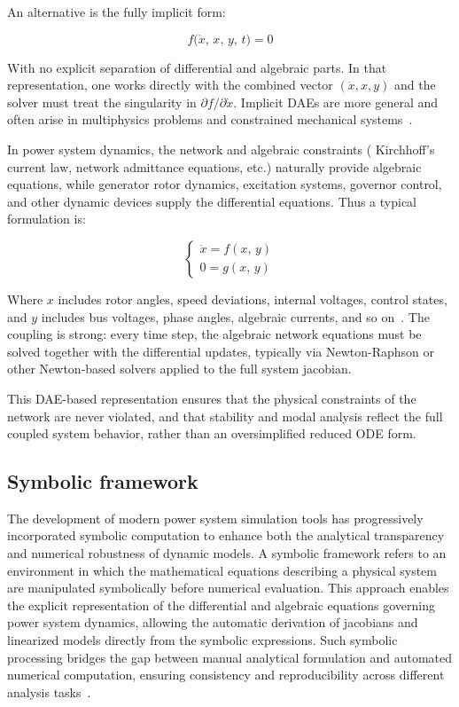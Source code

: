 An alternative is the fully implicit form:  

\begin{equation}
f\bigl(\dot{x},\, x,\, y,\, t \bigr) = 0
\end{equation}

With no explicit separation of differential and algebraic parts. In that representation, one works directly with the combined vector $(\dot{x}, x, y)$ and the solver must treat 
the singularity in $\partial f / \partial \dot{x}$. Implicit DAEs are more general and often arise in multiphysics problems and constrained mechanical systems~\cite{CasellaDAE}.  

 
In power system dynamics, the network and algebraic constraints ( Kirchhoff's current law, network admittance equations, etc.) naturally provide algebraic equations, 
while generator rotor dynamics, excitation systems, governor control, and other dynamic devices supply the differential equations. Thus a typical formulation is:

\begin{equation}
\begin{cases}
\dot{x} = f(x,\, y) \\
0 = g(x,\, y)
\end{cases}
\end{equation}

Where $x$ includes rotor angles, speed deviations, internal voltages, control states, and $y$ includes bus voltages, phase angles, algebraic currents, and so on~\cite{SauerPaiBook}. 
The coupling is strong: every time step, the algebraic network equations must be solved together with the differential updates, typically via Newton-Raphson or other Newton-based 
solvers applied to the full system jacobian.   

This DAE-based representation ensures that the physical constraints of the network are never violated, and that stability and modal analysis reflect the full coupled system behavior,
rather than an oversimplified reduced ODE form.  

\subsection{Symbolic framework}

The development of modern power system simulation tools has progressively incorporated symbolic computation to enhance both the analytical transparency and numerical
robustness of dynamic models. A symbolic framework refers to an environment in which the mathematical equations describing a physical system are manipulated symbolically
before numerical evaluation. This approach enables the explicit representation of the differential and algebraic equations governing power system dynamics, allowing the 
automatic derivation of jacobians and linearized models directly from the symbolic expressions.
Such symbolic processing bridges the gap between manual analytical formulation and automated numerical computation, ensuring consistency and reproducibility across 
different analysis tasks~\cite{SymbolicHantao}.

